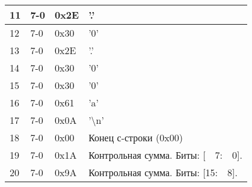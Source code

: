 \begin{longtable}{|C{15mm}|C{15mm}|C{30mm}|L{80mm}|}
%    
    11  & 7-0 & 0x2E  &  '.'\\ \hline
{}%
    12  & 7-0 & 0x30  &  '0'\\ \hline
{}%
    13  & 7-0 & 0x2E  &  '.'\\ \hline
{}%
    14  & 7-0 & 0x30  &  '0'\\ \hline
{}%
    15  & 7-0 & 0x30  &  '0'\\ \hline
{}%
    16  & 7-0 & 0x61  &  'a'\\ \hline 
{}%
    17  & 7-0 & 0x0A  &  '\textbackslash n' \\ \hline
{}%
    18  & 7-0 & 0x00  & Конец с-строки (0x00)\\ \hline 
{}%
    19  & 7-0 & 0x1A  & Контрольная сумма. Биты: [\ \ 7:\ \ 0]. \\ \hline  
{}%
    20  & 7-0 & 0x9A  & Контрольная сумма. Биты: [15:\ \ 8]. \\ \hline  
\end{longtable} \normalsize













